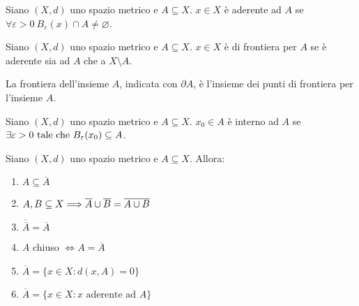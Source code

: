 \begin{definition}
    Siano $(X,d)$ uno spazio metrico e $A \subseteq X$. $x \in X$ è aderente ad $A$ se $\forall \varepsilon > 0 \ B_\varepsilon(x)\cap A \neq \varnothing$.
\end{definition}

\begin{definition}
    Siano $(X,d)$ uno spazio metrico e $A \subseteq X$. $x \in X$ è di frontiera per $A$ se è aderente sia ad $A$ che a $X \setminus A$.
\end{definition}

\begin{definition}
    [Frontiera]
    La frontiera dell'insieme $A$, indicata con $\partial A$, è l'insieme dei punti di frontiera per l'insieme $A$.
\end{definition}

\begin{definition}
    Siano $(X,d)$ uno spazio metrico e $A \subseteq X$. $x_0 \in A$ è interno ad $A$ se $\exists \varepsilon > 0 \text{ tale che } B_\varepsilon(x_0)\subseteq A$.
\end{definition}

\begin{theorem}
    \label{thm:chiusura}
    Siano $(X,d)$ uno spazio metrico e $A \subseteq X$. Allora:
    \begin{enumerate}
        \item $A \subseteq \overline A$
        \item $A, B \subseteq X \Longrightarrow \overline{A} \cup \overline{B} = \overline{A \cup B}$
        \item $\overline{\overline{A}} = \overline{A}$
        \item $A$ chiuso $\iff A = \overline{A}$
        \item $\overline{A} = \{x\in X : d(x,A) = 0\}$
        \item $\overline{A} = \{x \in X : x\text{ aderente ad }A\}$
    \end{enumerate}
\end{theorem}

